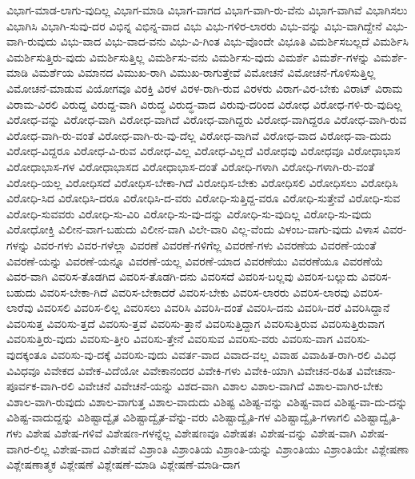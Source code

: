 {ವಿಭಾಗ-ಮಾಡ-ಲಾಗು-ವುದಿಲ್ಲ
ವಿಭಾಗ-ಮಾಡಿ
ವಿಭಾಗ-ವಾಗದ
ವಿಭಾಗ-ವಾಗಿ-ರು-ವೆನು
ವಿಭಾಗ-ವಾಗಿವೆ
ವಿಭಾಗಿಸಲು
ವಿಭಾಗಿಸಿ
ವಿಭಾಗಿ-ಸುವು-ದರ
ವಿಭಿನ್ನ
ವಿಭಿನ್ನ-ವಾದ
ವಿಭು
ವಿಭು-ಗಳಿರ-ಲಾರರು
ವಿಭು-ವನ್ನು
ವಿಭು-ವಾಗಿದ್ದೇನೆ
ವಿಭು-ವಾಗಿ-ರುವುದು
ವಿಭು-ವಾದ
ವಿಭು-ವಾದ-ವನು
ವಿಭು-ವಿ-ಗಿಂತ
ವಿಭು-ವೊಂದೇ
ವಿಭೂತಿ
ವಿಮರ್ಶಿಸಬಲ್ಲದೆ
ವಿಮರ್ಶಿಸಿ
ವಿಮರ್ಶಿಸುತ್ತಿರು-ವುದು
ವಿಮರ್ಶಿಸುತ್ತಿಲ್ಲ
ವಿಮರ್ಶಿಸು-ವನು
ವಿಮರ್ಶಿಸು-ವುದು
ವಿಮರ್ಶೆ
ವಿಮರ್ಶೆ-ಗಳನ್ನು
ವಿಮರ್ಶೆ-ಮಾಡಿ
ವಿಮರ್ಶೆಯ
ವಿಮಾನದ
ವಿಮುಖ-ರಾಗಿ
ವಿಮುಖ-ರಾಗುತ್ತೇವೆ
ವಿಮೋಚನೆ
ವಿಮೋಚನೆ-ಗೊಳಿಸುತ್ತಿಲ್ಲ
ವಿಮೋಚನೆ-ಮಾಡುವ
ವಿಯೋಗವೂ
ವಿರಕ್ತಿ
ವಿರಳ
ವಿರಳ-ರಾಗಿ-ರುವ
ವಿರಳರು
ವಿರಾಗ-ವಿರ-ಬೇಕು
ವಿರಾಟ್
ವಿರಾಮ
ವಿರಾಮ-ವಿರಲಿ
ವಿರುದ್ದ
ವಿರುದ್ದ-ವಾಗಿ
ವಿರುದ್ಧ
ವಿರುದ್ಧ-ವಾದ
ವಿರುವು-ದರಿಂದ
ವಿರೋಧ
ವಿರೋಧ-ಗಳಿ-ರು-ವುದಿಲ್ಲ
ವಿರೋಧ-ವನ್ನು
ವಿರೋಧ-ವಾಗಿ
ವಿರೋಧ-ವಾಗಿದೆ
ವಿರೋಧ-ವಾಗಿದ್ದರು
ವಿರೋಧ-ವಾಗಿದ್ದರೂ
ವಿರೋಧ-ವಾಗಿ-ರುವ
ವಿರೋಧ-ವಾಗಿ-ರು-ವಂತೆ
ವಿರೋಧ-ವಾಗಿ-ರು-ವು-ದೆಲ್ಲ
ವಿರೋಧ-ವಾಗಿವೆ
ವಿರೋಧ-ವಾದ
ವಿರೋಧ-ವಾ-ದುದು
ವಿರೋಧ-ವಿದ್ದರೂ
ವಿರೋಧ-ವಿ-ರುವ
ವಿರೋಧ-ವಿಲ್ಲ
ವಿರೋಧ-ವಿಲ್ಲದೆ
ವಿರೋಧವು
ವಿರೋಧವೂ
ವಿರೋಧಾಭಾಸ
ವಿರೋಧಾಭಾಸ-ಗಳ
ವಿರೋಧಾಭಾಸದ
ವಿರೋಧಾಭಾಸ-ದಂತೆ
ವಿರೋಧಿ-ಗಳಾಗಿ
ವಿರೋಧಿ-ಗಳಾಗಿ-ರು-ವಂತೆ
ವಿರೋಧಿ-ಯಲ್ಲ
ವಿರೋಧಿಸದೆ
ವಿರೋಧಿಸ-ಬೇಕಾ-ಗಿದೆ
ವಿರೋಧಿಸ-ಬೇಕು
ವಿರೋಧಿಸಲಿ
ವಿರೋಧಿಸಲು
ವಿರೋಧಿಸಿ
ವಿರೋಧಿ-ಸಿದ
ವಿರೋಧಿಸಿ-ದರೂ
ವಿರೋಧಿಸಿ-ದ-ವರು
ವಿರೋಧಿ-ಸುತ್ತಿದ್ದ-ವರೂ
ವಿರೋಧಿ-ಸುತ್ತೇವೆ
ವಿರೋಧಿ-ಸುವ
ವಿರೋಧಿ-ಸುವವರು
ವಿರೋಧಿ-ಸು-ವಿರಿ
ವಿರೋಧಿ-ಸು-ವು-ದನ್ನು
ವಿರೋಧಿ-ಸು-ವುದಿಲ್ಲ
ವಿರೋಧಿ-ಸು-ವುದು
ವಿರೋಧೋಕ್ತಿ
ವಿಲೀನ-ವಾಗ-ಬಹುದು
ವಿಲೀನ-ವಾಗಿ
ವಿಲೇ-ವಾರಿ
ವಿಲ್ಲ-ವೆಂದು
ವಿಳಂಬ-ವಾಗು-ವುದು
ವಿಳಾಸ
ವಿವರ-ಗಳನ್ನು
ವಿವರ-ಗಳು
ವಿವರ-ಗಳೆಲ್ಲಾ
ವಿವರಣೆ
ವಿವರಣೆ-ಗಳಿಗೆಲ್ಲ
ವಿವರಣೆ-ಗಳು
ವಿವರಣೆಯ
ವಿವರಣೆ-ಯಂತೆ
ವಿವರಣೆ-ಯನ್ನು
ವಿವರಣೆ-ಯನ್ನೂ
ವಿವರಣೆ-ಯಲ್ಲ
ವಿವರಣೆ-ಯಾದ
ವಿವರಣೆಯು
ವಿವರಣೆಯೂ
ವಿವರಣೆಯೆ
ವಿವರ-ವಾಗಿ
ವಿವರಿಸ-ತೊಡಗಿದ
ವಿವರಿಸ-ತೊಡಗಿ-ದನು
ವಿವರಿಸದೆ
ವಿವರಿಸ-ಬಲ್ಲವು
ವಿವರಿಸ-ಬಲ್ಲುದು
ವಿವರಿಸ-ಬಹುದು
ವಿವರಿಸ-ಬೇಕಾ-ಗಿದೆ
ವಿವರಿಸ-ಬೇಕಾದರೆ
ವಿವರಿಸ-ಬೇಕು
ವಿವರಿಸ-ಲಾರರು
ವಿವರಿಸ-ಲಾರವು
ವಿವರಿಸ-ಲಾರೆವು
ವಿವರಿಸಲಿ
ವಿವರಿಸ-ಲಿಲ್ಲ
ವಿವರಿಸಲು
ವಿವರಿಸಿ
ವಿವರಿಸಿ-ದಂತೆ
ವಿವರಿಸಿ-ದನು
ವಿವರಿಸಿ-ದರೆ
ವಿವರಿಸಿದ್ದಾನೆ
ವಿವರಿಸುತ್ತ
ವಿವರಿಸು-ತ್ತದೆ
ವಿವರಿಸು-ತ್ತವೆ
ವಿವರಿಸು-ತ್ತಾನೆ
ವಿವರಿಸುತ್ತಿದ್ದಾಗ
ವಿವರಿಸುತ್ತಿರುವ
ವಿವರಿಸುತ್ತಿರುವಾಗ
ವಿವರಿಸುತ್ತಿರು-ವುದು
ವಿವರಿಸು-ತ್ತೀರಿ
ವಿವರಿಸು-ತ್ತೇನೆ
ವಿವರಿಸುವ
ವಿವರಿಸು-ವರು
ವಿವರಿಸು-ವಾಗ
ವಿವರಿಸು-ವುದಕ್ಕಂತೂ
ವಿವರಿಸು-ವು-ದಕ್ಕೆ
ವಿವರಿಸು-ವುದು
ವಿವರ್ತ-ವಾದ
ವಿವಾದ-ವಲ್ಲ
ವಿವಾಹ
ವಿವಾಹಿತ-ರಾಗಿ-ರಲಿ
ವಿವಿಧ
ವಿವಿಧವೂ
ವಿವೇಕದ
ವಿವೇಕ-ವಿದೆಯೋ
ವಿವೇಕಾನಂದರ
ವಿವೇಕಿ-ಗಳು
ವಿವೇಕಿ-ಯಾಗಿ
ವಿವೇಚನ-ರಹಿತ
ವಿವೇಚನಾ-ಪೂರ್ವಕ-ವಾಗಿ-ರಲಿ
ವಿವೇಚನೆ
ವಿವೇಚನೆ-ಯನ್ನು
ವಿಶದ-ವಾಗಿ
ವಿಶಾಲ
ವಿಶಾಲ-ವಾಗಿದೆ
ವಿಶಾಲ-ವಾಗಿರ-ಬೇಕು
ವಿಶಾಲ-ವಾಗಿ-ರುವುದು
ವಿಶಾಲ-ವಾಗುತ್ತ
ವಿಶಾಲ-ವಾದುದು
ವಿಶಿಷ್ಟ
ವಿಶಿಷ್ಟ-ವನ್ನು
ವಿಶಿಷ್ಟ-ವಾದ
ವಿಶಿಷ್ಟ-ವಾ-ದು-ದನ್ನು
ವಿಶಿಷ್ಟ-ವಾದುದ್ದನ್ನು
ವಿಶಿಷ್ಟಾದ್ವೈತ
ವಿಶಿಷ್ಟಾದ್ವೈತ-ವೆನ್ನು-ವರು
ವಿಶಿಷ್ಟಾದ್ವೈತಿ-ಗಳ
ವಿಶಿಷ್ಟಾದ್ವೈತಿ-ಗಳಾಗಲಿ
ವಿಶಿಷ್ಟಾದ್ವೈತಿ-ಗಳು
ವಿಶೇಷ
ವಿಶೇಷ-ಗಳಿವೆ
ವಿಶೇಷಣ-ಗಳನ್ನೆಲ್ಲ
ವಿಶೇಷಣವೂ
ವಿಶೇಷತಃ
ವಿಶೇಷ-ವನ್ನು
ವಿಶೇಷ-ವಾಗಿ
ವಿಶೇಷ-ವಾಗಿರ-ಲಿಲ್ಲ
ವಿಶೇಷ-ವಾದ
ವಿಶೇಷವೆ
ವಿಶ್ರಾಂತಿ
ವಿಶ್ರಾಂತಿಯ
ವಿಶ್ರಾಂತಿ-ಯನ್ನು
ವಿಶ್ರಾಂತಿಯು
ವಿಶ್ರಾಂತಿಯೇ
ವಿಶ್ಲೇಷಣಾ
ವಿಶ್ಲೇಷಣಾತ್ಮಕ
ವಿಶ್ಲೇಷಣೆ
ವಿಶ್ಲೇಷಣೆ-ಮಾಡಿ
ವಿಶ್ಲೇಷಣೆ-ಮಾಡಿ-ದಾಗ
}
